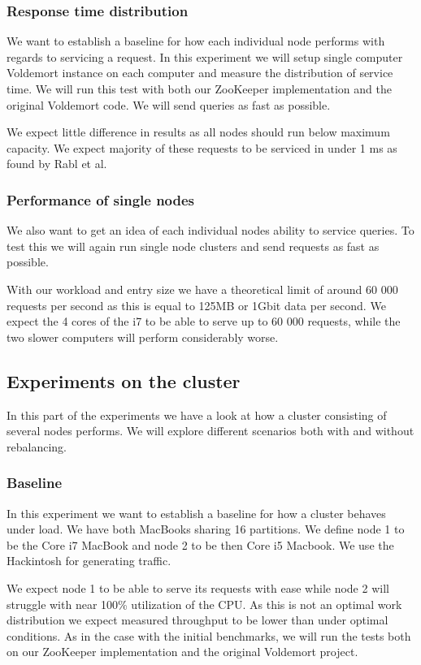 \subsubsection{Response time distribution}
We want to establish a baseline for how each individual node performs with regards to servicing a request. In this experiment we will setup single computer Voldemort instance on each computer and measure the distribution of service time. We will run this test with both our ZooKeeper implementation and the original Voldemort code. We will send queries as fast as possible.

We expect little difference in results as all nodes should run below maximum capacity. We expect majority of these requests to be serviced in under 1 ms as found by Rabl et al\cite{Rabl:2012:SBD:2367502.2367512}.

\subsubsection{Performance of single nodes}
We also want to get an idea of each individual nodes ability to service queries. To test this we will again run single node clusters and send requests as fast as possible.

With our workload and entry size we have a theoretical limit of around 60 000 requests per second as this is equal to 125MB or 1Gbit data per second. We expect the 4 cores of the i7 to be able to serve up to 60 000 requests, while the two slower computers will perform considerably worse. 

\subsection{Experiments on the cluster}
In this part of the experiments we have a look at how a cluster consisting of several nodes performs. We will explore different scenarios both with and without rebalancing.

\subsubsection{Baseline}
In this experiment we want to establish a baseline for how a cluster behaves under load. We have both MacBooks sharing 16 partitions. We define node 1 to be the Core i7 MacBook and node 2 to be then Core i5 Macbook.  We use the Hackintosh for generating traffic. 

We expect node 1 to be able to serve its requests with ease while node 2 will struggle with near 100\% utilization of the CPU. As this is not an optimal work distribution we expect measured throughput to be lower than under optimal conditions. As in the case with the initial benchmarks, we will run the tests both on our ZooKeeper implementation and the original Voldemort project. 

